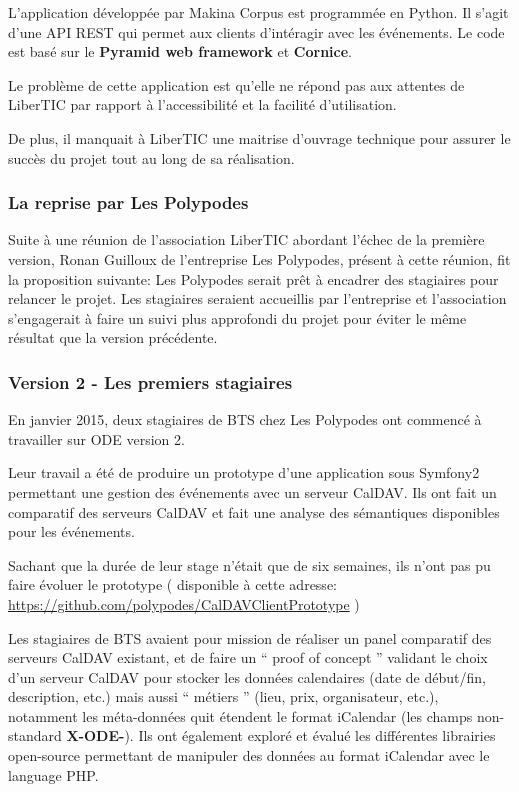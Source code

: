L'application développée par Makina Corpus est programmée en Python. Il s'agit d'une API REST qui permet aux clients d'intéragir avec les événements. Le code est basé sur le \textbf{Pyramid web framework} et \textbf{Cornice}.

Le problème de cette application est qu'elle ne répond pas aux attentes de LiberTIC par rapport à l'accessibilité et la facilité d'utilisation.

De plus, il manquait à LiberTIC une maitrise d'ouvrage technique pour assurer le succès du projet tout au long de sa réalisation.

\subsubsection*{La reprise par Les Polypodes}

Suite à une réunion de l'association LiberTIC abordant l'échec de la première version, Ronan Guilloux de l'entreprise Les Polypodes, présent à cette réunion, fit la proposition suivante: Les Polypodes serait prêt à encadrer des stagiaires pour relancer le projet. Les stagiaires seraient accueillis par l'entreprise et l'association s'engagerait à faire un suivi plus approfondi du projet pour éviter le même résultat que la version précédente.

\subsubsection*{Version 2 - Les premiers stagiaires}

En janvier 2015, deux stagiaires de BTS chez Les Polypodes ont commencé à travailler sur ODE version 2.

Leur travail a été de produire un prototype d'une application sous Symfony2 permettant une gestion des événements avec un serveur CalDAV. Ils ont fait un comparatif des serveurs CalDAV et fait une analyse des sémantiques disponibles pour les événements.

Sachant que la durée de leur stage n'était que de six semaines, ils n'ont pas pu faire évoluer le prototype ( disponible à cette adresse: \url{https://github.com/polypodes/CalDAVClientPrototype} )

Les stagiaires de BTS avaient pour mission de réaliser un panel comparatif des serveurs CalDAV existant, et de faire un `` proof of concept '' validant le choix d'un serveur CalDAV pour stocker les données calendaires (date de début/fin, description, etc.) mais aussi `` métiers '' (lieu, prix, organisateur, etc.), notamment les méta-données quit étendent le format iCalendar (les champs non-standard \textbf{X-ODE-}). Ils ont également exploré et évalué les différentes librairies open-source permettant de manipuler des données au format iCalendar avec le language PHP.

